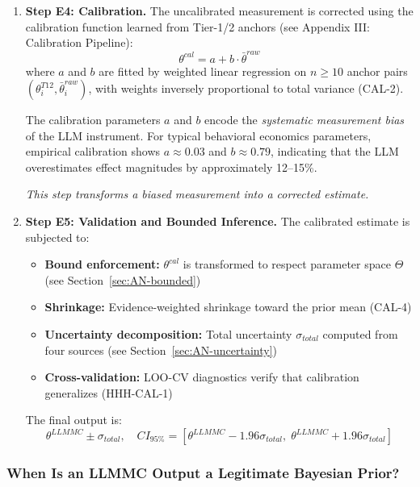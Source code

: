 \begin{enumerate}
    \item \textbf{Step E4: Calibration.}
    The uncalibrated measurement is corrected using the calibration function learned
    from Tier-1/2 anchors (see Appendix III: Calibration Pipeline):
    \begin{equation}
        \theta^{cal} = a + b \cdot \bar{\theta}^{raw} \label{eq:calibration}
    \end{equation}
    where $a$ and $b$ are fitted by weighted linear regression on $n \geq 10$ anchor pairs
    $(\theta^{T12}_i, \bar{\theta}^{raw}_i)$, with weights inversely proportional to total
    variance (CAL-2).

    The calibration parameters $a$ and $b$ encode the \textit{systematic measurement bias}
    of the LLM instrument. For typical behavioral economics parameters, empirical calibration
    shows $a \approx 0.03$ and $b \approx 0.79$, indicating that the LLM overestimates
    effect magnitudes by approximately 12--15\%.

    \textit{This step transforms a biased measurement into a corrected estimate.}

    \item \textbf{Step E5: Validation and Bounded Inference.}
    The calibrated estimate is subjected to:
    \begin{itemize}[nosep]
        \item \textbf{Bound enforcement:} $\theta^{cal}$ is transformed to respect parameter
              space $\Theta$ (see Section~\ref{sec:AN-bounded})
        \item \textbf{Shrinkage:} Evidence-weighted shrinkage toward the prior mean (CAL-4)
        \item \textbf{Uncertainty decomposition:} Total uncertainty $\sigma_{total}$ computed
              from four sources (see Section~\ref{sec:AN-uncertainty})
        \item \textbf{Cross-validation:} LOO-CV diagnostics verify that calibration generalizes (HHH-CAL-1)
    \end{itemize}
    The final output is:
    \begin{equation}
        \theta^{LLMMC} \pm \sigma_{total}, \quad
        CI_{95\%} = [\theta^{LLMMC} - 1.96\sigma_{total}, \;
                      \theta^{LLMMC} + 1.96\sigma_{total}]
        \label{eq:final-output}
    \end{equation}
\end{enumerate}

\subsubsection{When Is an LLMMC Output a Legitimate Bayesian Prior?}
\label{sec:AN-legitimacy}

